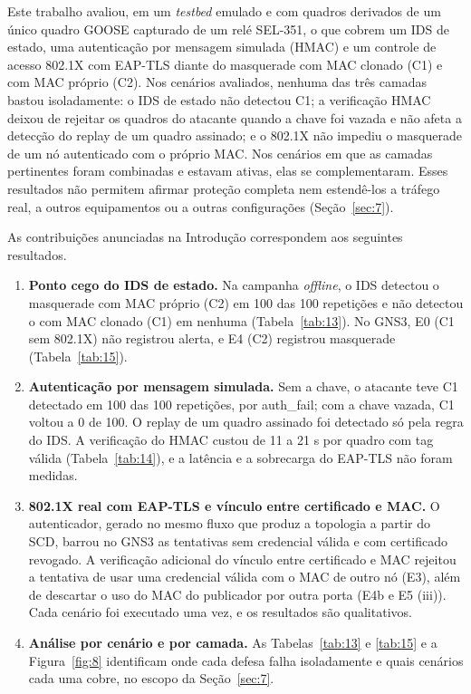 \documentclass[12pt]{article}
\begin{document}
Este trabalho avaliou, em um \emph{testbed} emulado e com quadros derivados de um único quadro GOOSE capturado de um relé SEL-351, o que cobrem um IDS de estado, uma autenticação por mensagem simulada (HMAC) e um controle de acesso 802.1X com EAP-TLS diante do masquerade com MAC clonado (C1) e com MAC próprio (C2). Nos cenários avaliados, nenhuma das três camadas bastou isoladamente: o IDS de estado não detectou C1; a verificação HMAC deixou de rejeitar os quadros do atacante quando a chave foi vazada e não afeta a detecção do replay de um quadro assinado; e o 802.1X não impediu o masquerade de um nó autenticado com o próprio MAC. Nos cenários em que as camadas pertinentes foram combinadas e estavam ativas, elas se complementaram. Esses resultados não permitem afirmar proteção completa nem estendê-los a tráfego real, a outros equipamentos ou a outras configurações (Seção~\ref{sec:7}).

As contribuições anunciadas na Introdução correspondem aos seguintes resultados.

\begin{enumerate}
\item \textbf{Ponto cego do IDS de estado.} Na campanha \emph{offline}, o IDS detectou o masquerade com MAC próprio (C2) em 100 das 100 repetições e não detectou o com MAC clonado (C1) em nenhuma (Tabela~\ref{tab:13}). No GNS3, E0 (C1 sem 802.1X) não registrou alerta, e E4 (C2) registrou masquerade (Tabela~\ref{tab:15}).
\item \textbf{Autenticação por mensagem simulada.} Sem a chave, o atacante teve C1 detectado em 100 das 100 repetições, por auth\_\allowbreak{}fail; com a chave vazada, C1 voltou a 0 de 100. O replay de um quadro assinado foi detectado só pela regra do IDS. A verificação do HMAC custou de 11 a 21 \textmu{}s por quadro com tag válida (Tabela~\ref{tab:14}), e a latência e a sobrecarga do EAP-TLS não foram medidas.
\item \textbf{802.1X real com EAP-TLS e vínculo entre certificado e MAC.} O autenticador, gerado no mesmo fluxo que produz a topologia a partir do SCD, barrou no GNS3 as tentativas sem credencial válida e com certificado revogado. A verificação adicional do vínculo entre certificado e MAC rejeitou a tentativa de usar uma credencial válida com o MAC de outro nó (E3), além de descartar o uso do MAC do publicador por outra porta (E4b e E5 (iii)). Cada cenário foi executado uma vez, e os resultados são qualitativos.
\item \textbf{Análise por cenário e por camada.} As Tabelas~\ref{tab:13} e \ref{tab:15} e a Figura~\ref{fig:8} identificam onde cada defesa falha isoladamente e quais cenários cada uma cobre, no escopo da Seção~\ref{sec:7}.
\end{enumerate}
\end{document}
